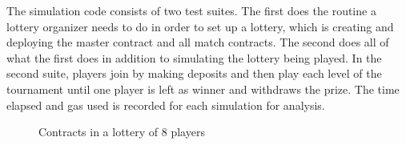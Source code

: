 The simulation code consists of two test suites. The first does the routine a lottery organizer needs to do in order to set up a lottery, which is creating and deploying the master contract and all match contracts. The second does all of what the first does in addition to simulating the lottery being played. In the second suite, players join by making deposits and then play each level of the tournament until one player is left as winner and withdraws the prize.
The time elapsed and gas used is recorded for each simulation for analysis.

\begin{figure}[htbp]
  \centering
  
  \caption{Contracts in a lottery of 8 players}
\end{figure}
